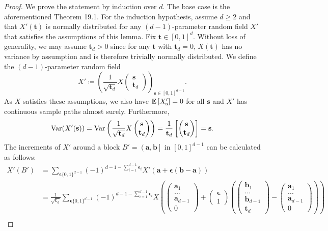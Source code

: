 \begin{proof}
    We prove the statement by induction over $d$. The base case is the aforementioned \cite{[4]billingsley1968convergence} Theorem 19.1. For the induction hypothesis, assume $d \geq 2$ and that $X'(\mathbf{t})$ is normally distributed for any $(d-1)$-parameter random field $X'$ that satisfies the assumptions of this lemma. Fix $\mathbf{t} \in [0,1]^d$. Without loss of generality, we may assume $\mathbf{t}_d > 0$ since for any $\mathbf{t}$ with $\mathbf{t}_d = 0$, $X(\mathbf{t})$ has no variance by assumption and is therefore trivially normally distributed. We define the $(d-1)$-parameter random field 
    \[ X' \coloneqq \left( \frac{1}{\sqrt{\mathbf{t}_d}} X\begin{pmatrix} \mathbf{s} \\ \mathbf{t}_d \end{pmatrix}\right)_{\mathbf{s} \in [0, 1]^{d-1}}. \]
    As $X$ satisfies these assumptions, we also have $\mathbb{E}\left[X'_\mathbf{s}\right] = 0$ for all $\mathbf{s}$ and $X'$ has continuous sample paths almost surely. Furthermore,
    \[ \mathrm{Var}(X'(\mathbf{s})) = \mathrm{Var}\left( \frac{1}{\sqrt{\mathbf{t}_d}} X\begin{pmatrix}\mathbf{s} \\ \mathbf{t}_d \end{pmatrix}\right) = \frac{1}{\mathbf{t}_d} \left[ \begin{pmatrix} \mathbf{s} \\ \mathbf{t}_d \end{pmatrix} \right] = \mathbf{s}. \]
    The increments of $X'$ around a block $B' = \left( \mathbf{a}, \mathbf{b} \right]$ in $[0, 1]^{d-1}$ can be calculated as follows:
    \begin{align*}
        X'(B')
        & = \sum\limits_{{\boldsymbol{\epsilon}} \{0, 1\}^{d-1}} (-1)^{d-1 - \sum\limits_{i=1}^{d-1} {\boldsymbol{\epsilon}}_i} X'\left( \mathbf{a} + {\boldsymbol{\epsilon}} (\mathbf{b}-\mathbf{a}) \right) \\
        & = \frac{1}{\sqrt{\mathbf{t}_d}} \sum\limits_{{\boldsymbol{\epsilon}} \{0, 1\}^{d-1}} (-1)^{d-1 - \sum\limits_{i=1}^{d-1} {\boldsymbol{\epsilon}}_i}  X\left( \begin{pmatrix} \mathbf{a}_1 \\ ... \\ \mathbf{a}_{d-1} \\ 0 \end{pmatrix} + \begin{pmatrix} {\boldsymbol{\epsilon}} \\ 1 \end{pmatrix} \left(\begin{pmatrix} \mathbf{b}_1 \\ ... \\ \mathbf{b}_{d-1} \\ \mathbf{t}_d \end{pmatrix}-\begin{pmatrix} \mathbf{a}_1 \\ ... \\ \mathbf{a}_{d-1} \\ 0 \end{pmatrix}\right) \right) \\

\end{align*}
\end{proof}
